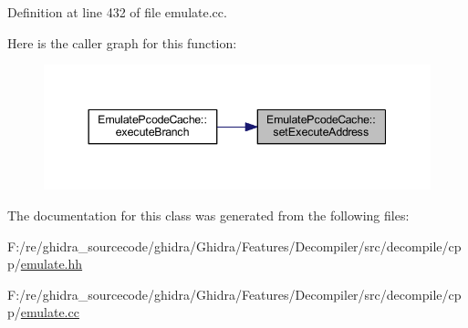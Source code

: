 Definition at line 432 of file emulate.\+cc.

Here is the caller graph for this function\+:
\nopagebreak
\begin{figure}[H]
\begin{center}
\leavevmode
\includegraphics[width=344pt]{class_emulate_pcode_cache_a732fcebcb6aae1a9e7b9e833df6f1e85_icgraph}
\end{center}
\end{figure}


The documentation for this class was generated from the following files\+:\begin{DoxyCompactItemize}
\item 
F\+:/re/ghidra\+\_\+sourcecode/ghidra/\+Ghidra/\+Features/\+Decompiler/src/decompile/cpp/\mbox{\hyperlink{emulate_8hh}{emulate.\+hh}}\item 
F\+:/re/ghidra\+\_\+sourcecode/ghidra/\+Ghidra/\+Features/\+Decompiler/src/decompile/cpp/\mbox{\hyperlink{emulate_8cc}{emulate.\+cc}}\end{DoxyCompactItemize}
